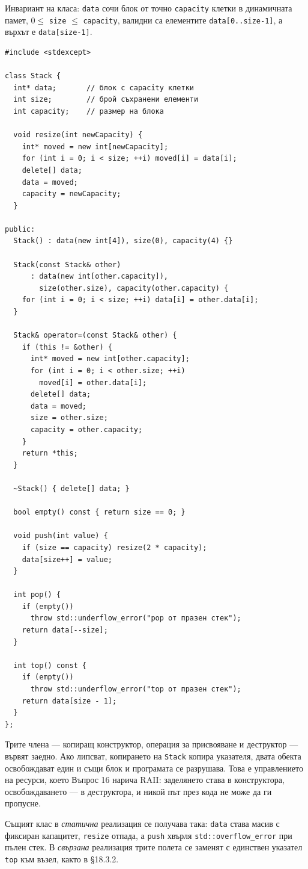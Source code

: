 Инвариант на класа: \verb|data| сочи блок от точно \verb|capacity| клетки в
динамичната памет, $0\le$ \verb|size| $\le$ \verb|capacity|, валидни са
елементите \verb|data[0..size-1]|, а върхът е \verb|data[size-1]|.

\begin{verbatim}
#include <stdexcept>

class Stack {
  int* data;       // блок с capacity клетки
  int size;        // брой съхранени елементи
  int capacity;    // размер на блока

  void resize(int newCapacity) {
    int* moved = new int[newCapacity];
    for (int i = 0; i < size; ++i) moved[i] = data[i];
    delete[] data;
    data = moved;
    capacity = newCapacity;
  }

public:
  Stack() : data(new int[4]), size(0), capacity(4) {}

  Stack(const Stack& other)
      : data(new int[other.capacity]),
        size(other.size), capacity(other.capacity) {
    for (int i = 0; i < size; ++i) data[i] = other.data[i];
  }

  Stack& operator=(const Stack& other) {
    if (this != &other) {
      int* moved = new int[other.capacity];
      for (int i = 0; i < other.size; ++i)
        moved[i] = other.data[i];
      delete[] data;
      data = moved;
      size = other.size;
      capacity = other.capacity;
    }
    return *this;
  }

  ~Stack() { delete[] data; }

  bool empty() const { return size == 0; }

  void push(int value) {
    if (size == capacity) resize(2 * capacity);
    data[size++] = value;
  }

  int pop() {
    if (empty())
      throw std::underflow_error("pop от празен стек");
    return data[--size];
  }

  int top() const {
    if (empty())
      throw std::underflow_error("top от празен стек");
    return data[size - 1];
  }
};
\end{verbatim}

Трите члена --- копиращ конструктор, операция за присвояване и деструктор ---
вървят заедно. Ако липсват, копирането на \verb|Stack| копира указателя, двата
обекта освобождават един и същи блок и програмата се разрушава. Това е
управлението на ресурси, което Въпрос 16 нарича RAII: заделянето става в
конструктора, освобождаването --- в деструктора, и никой път през кода не може
да ги пропусне.

Същият клас в \emph{статична} реализация се получава така: \verb|data| става
масив с фиксиран капацитет, \verb|resize| отпада, а \verb|push| хвърля
\verb|std::overflow_error| при пълен стек. В \emph{свързана} реализация трите
полета се заменят с единствен указател \verb|top| към възел, както в \S18.3.2.

